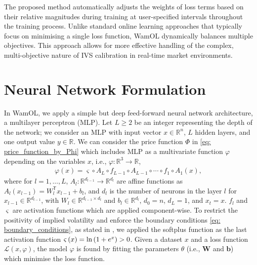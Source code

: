\documentclass[sigconf, authorversion=true, nonacm=true]{acmart}
\begin{document}
The proposed method automatically adjusts the weights of loss terms based on their relative magnitudes during training at user-specified intervals throughout the training process. Unlike standard online learning approaches that typically focus on minimising a single loss function, WamOL dynamically balances multiple objectives. This approach allows for more effective handling of the complex, multi-objective nature of IVS calibration in real-time market environments.

\section{Neural Network Formulation}
\label{section: Neural Network Formulation}
In WamOL, we apply a simple but deep feed-forward neural network architecture, a multilayer perceptron (MLP). Let $L \geq 2$ be an integer representing the depth of the network; we consider an MLP with input vector $x \in \mathbb{R}^n$, $L$ hidden layers, and one output value $y \in \mathbb{R}$. We can consider the price function $\Phi$ in \eqref{eq: price_function_by_Phi} which includes MLP as a multivariate function $\varphi$ depending on the variables $x$, i.e., $\varphi: \mathbb{R}^3 \rightarrow \mathbb{R}$,
\begin{equation}
\begin{gathered}
    \varphi\left(x\right) = \varsigma \circ A_L \circ f_{L-1} \circ A_{L-1} \circ \cdots \circ f_1 \circ A_1\left(x\right),
\end{gathered}    
\end{equation}
where for $l=1,\ldots , L$, $A_{l}: \mathbb{R}^{d_{l-1}} \rightarrow \mathbb{R}^{d_{l}}$ are affine functions as $A_l(x_{l-1}) = W_l^\mathsf{T} x_{l-1} + b_l$, and $d_l$ is the number of neurons in the layer $l$ for $x_{l-1} \in \mathbb{R}^{d_{l-1}}$, with $W_l \in \mathbb{R}^{d_{l-1} \times d_l}$ and $b_l \in \mathbb{R}^{d_l}$,  $d_{0}=n$, $d_{L}=1$, and $x_t=x$. $f_l$ and $\varsigma$ are activation functions which are applied component-wise. To restrict the positivity of implied volatility and enforce the boundary conditions \eqref{eq: boundary_conditions}, as stated in \cite{lee2005implied}, we applied the softplus function as the last activation function $\varsigma\left(x\right) = {\rm ln}\left(1+e^x\right) > 0$. Given a dataset $x$ and a loss function $\mathcal{L}(x, \varphi)$, the model $\varphi$ is found by fitting the parameters $\theta$ (i.e., $\textbf{W}$ and $\textbf{b}$) which minimise the loss function.
\end{document}
